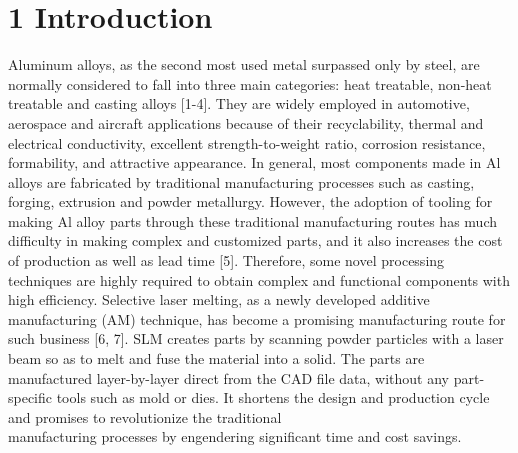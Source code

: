 \documentclass[10pt]{article}
\begin{document}
\section*{1 Introduction}
Aluminum alloys, as the second most used metal surpassed only by steel, are normally considered to fall into three main categories: heat treatable, non-heat treatable and casting alloys [1-4]. They are widely employed in automotive, aerospace and aircraft applications because of their recyclability, thermal and electrical conductivity, excellent strength-to-weight ratio, corrosion resistance, formability, and attractive appearance. In general, most components made in $\mathrm{Al}$ alloys are fabricated by traditional manufacturing processes such as casting, forging, extrusion and powder metallurgy. However, the adoption of tooling for making Al alloy parts through these traditional manufacturing routes has much difficulty in making complex and customized parts, and it also increases the cost of production as well as lead time [5]. Therefore, some novel processing techniques are highly required to obtain complex and functional components with high efficiency. Selective laser melting, as a newly developed additive manufacturing (AM) technique, has become a promising manufacturing route for such business [6, 7]. SLM creates parts by scanning powder particles with a laser beam so as to melt and fuse the material into a solid. The parts are manufactured layer-by-layer direct from the CAD file data, without any part-specific tools such as mold or dies. It shortens the design and production cycle and promises to revolutionize the traditional\\
manufacturing processes by engendering significant time and cost savings.
\end{document}
